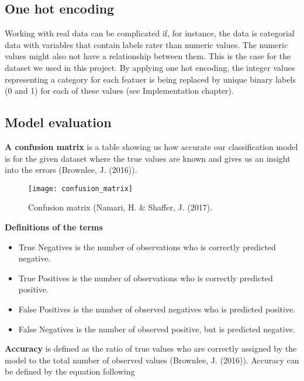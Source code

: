 \documentclass[11pt,english, A4]{article}
\begin{document}
\subsection{One hot encoding}
Working with real data can be complicated if, for instance, the data is categorial data with variables that contain labels rater than numeric values. The numeric values might also not have a relationship between them. This is the case for the dataset we used in this project. By applying one hot encoding, the integer values representing a category for each featuer is being replaced by unique binary labels (0 and 1) for each of these values (see Implementation chapter).


\subsection{Model evaluation}

\textbf{A confusion matrix} is a table showing us how accurate our classification model is for the given dataset where the true values are known and gives us an insight into the errors (Brownlee, J. (2016)). 

\begin{figure}[H]
  \texttt{[image: confusion\_matrix]}
  \caption{Confusion matrix (Namari, H. \& Shaffer, J. (2017).}
\end{figure}

\newpage
\textbf{Definitions of the terms}
\begin{itemize}
  \item True Negatives is the number of observations who is correctly predicted negative. 
  \item True Positives is the number of observations who is correctly predicted positive.  
  \item False Positives is the number of observed negatives who is predicted positive. 
  \item False Negatives is the number of observed positive, but is predicted negative. 
\end{itemize}

\textbf{Accuracy} is defined as the ratio of true values who are correctly assigned by the model to the total number of observed values (Brownlee, J. (2016)). Accuracy can be defined by the equation following
\end{document}
